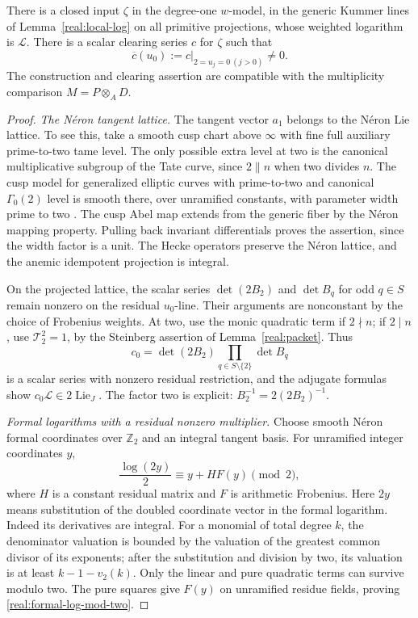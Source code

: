 \begin{lemma}\label{real:input-clearing}
There is a closed input \(\zeta\) in the degree-one \(w\)-model,
in the generic Kummer lines of Lemma~\ref{real:local-log} on all
primitive projections, whose weighted logarithm is \(\mathcal L\).
There is a scalar clearing series \(c\) for \(\zeta\) such that
\[
 \overline c(u_0)
   :=c\big|_{2=u_j=0\ (j>0)}\ne0.
\]
The construction and clearing assertion are compatible with the
multiplicity comparison \(M=P\otimes_A D\).
\end{lemma}

\begin{proof}
\emph{The N\'eron tangent lattice.}
The tangent vector \(a_1\) belongs to the N\'eron Lie lattice. To see
this, take a smooth cusp chart above \(\infty\) with fine full
auxiliary prime-to-two tame level. The only possible extra level at
two is the canonical multiplicative subgroup of the Tate curve,
since \(2\|n\) when two divides \(n\). The cusp model for
generalized elliptic curves with prime-to-two and canonical
\(\Gamma_0(2)\) level is smooth there, over unramified constants,
with parameter width prime to two
\cite{KatzMazur85,DeligneRapoport73}. The cusp Abel map extends from
the generic fiber by the N\'eron mapping property. Pulling back
invariant differentials proves the assertion, since the width factor
is a unit. The Hecke operators preserve the N\'eron lattice, and the
anemic idempotent projection is integral.

On the projected lattice, the scalar series
\(\det(2B_2)\) and \(\det B_q\) for odd \(q\in S\) remain nonzero
on the residual \(u_0\)-line. Their arguments are nonconstant by the
choice of Frobenius weights. At two, use the monic quadratic term if
\(2\nmid n\); if \(2\mid n\), use \(\mathcal T_2^2=1\), by the
Steinberg assertion of Lemma~\ref{real:packet}. Thus
\[
 c_0=\det(2B_2)\prod_{q\in S\setminus\{2\}}\det B_q
\]
is a scalar series with nonzero residual restriction, and the
adjugate formulas show
\(c_0\mathcal L\in2\operatorname{Lie}_J\). The factor two is
explicit: \(B_2^{-1}=2(2B_2)^{-1}\).

\emph{Formal logarithms with a residual nonzero multiplier.}
Choose smooth N\'eron formal coordinates over \(\mathbb Z_2\) and
an integral tangent basis. For unramified integer coordinates \(y\),
\begin{equation}\label{real:formal-log-mod-two}
 \frac{\log(2y)}2\equiv y+H F(y)\pmod2,
\end{equation}
where \(H\) is a constant residual matrix and \(F\) is arithmetic
Frobenius. Here \(2y\) means substitution of the doubled coordinate
vector in the formal logarithm. Indeed its derivatives are integral.
For a monomial of total degree \(k\), the denominator valuation is
bounded by the valuation of the greatest common divisor of its
exponents; after the substitution and division by two, its valuation
is at least \(k-1-v_2(k)\). Only the linear and pure quadratic terms
can survive modulo two. The pure squares give \(F(y)\) on
unramified residue fields, proving \eqref{real:formal-log-mod-two}.


\end{proof}
